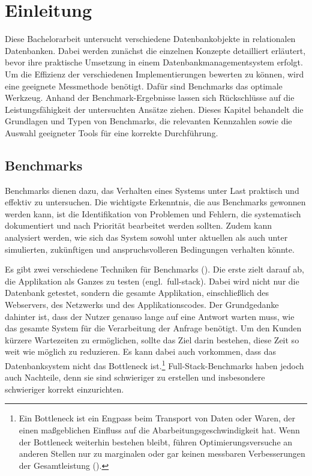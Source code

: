\chapter{Einleitung}\label{ch:einleitung}

Diese Bachelorarbeit untersucht verschiedene Datenbankobjekte in relationalen Datenbanken.
Dabei werden zunächst die einzelnen Konzepte detailliert erläutert, bevor ihre praktische Umsetzung in einem Datenbankmanagementsystem erfolgt.
Um die Effizienz der verschiedenen Implementierungen bewerten zu können, wird eine geeignete Messmethode benötigt.
Dafür sind Benchmarks das optimale Werkzeug.
Anhand der Benchmark-Ergebnisse lassen sich Rückschlüsse auf die Leistungsfähigkeit der untersuchten Ansätze ziehen.
Dieses Kapitel behandelt die Grundlagen und Typen von Benchmarks, die relevanten Kennzahlen sowie die Auswahl geeigneter Tools für eine korrekte Durchführung.

\section{Benchmarks}\label{sec:einleitung-einfuehrung}

Benchmarks dienen dazu, das Verhalten eines Systems unter Last praktisch und effektiv zu untersuchen.
Die wichtigste Erkenntnis, die aus Benchmarks gewonnen werden kann, ist die Identifikation von Problemen und Fehlern, die systematisch dokumentiert und nach Priorität bearbeitet werden sollten.
Zudem kann analysiert werden, wie sich das System sowohl unter aktuellen als auch unter simulierten, zukünftigen und anspruchsvolleren Bedingungen verhalten könnte.

Es gibt zwei verschiedene Techniken für Benchmarks (\cite[S. 35--49]{schwartz2012high}).
Die erste zielt darauf ab, die Applikation als Ganzes zu testen (engl.\ full-stack).
Dabei wird nicht nur die Datenbank getestet, sondern die gesamte Applikation, einschließlich des Webservers, des Netzwerks und des Applikationscodes.
Der Grundgedanke dahinter ist, dass der Nutzer genauso lange auf eine Antwort warten muss, wie das gesamte System für die Verarbeitung der Anfrage benötigt.
Um den Kunden kürzere Wartezeiten zu ermöglichen, sollte das Ziel darin bestehen, diese Zeit so weit wie möglich zu reduzieren.
Es kann dabei auch vorkommen, dass das Datenbanksystem nicht das Bottleneck ist.\footnote{Ein Bottleneck ist ein Engpass beim Transport von Daten oder Waren, der einen maßgeblichen Einfluss auf die Abarbeitungsgeschwindigkeit hat. Wenn der Bottleneck weiterhin bestehen bleibt, führen Optimierungsversuche an anderen Stellen nur zu marginalen oder gar keinen messbaren Verbesserungen der Gesamtleistung (\cite{bottleneck}).}
Full-Stack-Benchmarks haben jedoch auch Nachteile, denn sie sind schwieriger zu erstellen und insbesondere schwieriger korrekt einzurichten.

